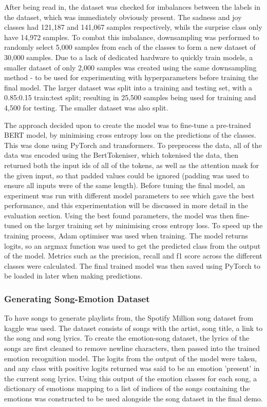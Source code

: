 \documentclass[11pt]{article}
\begin{document}
After being read in, the dataset was checked for imbalances between the labels in the dataset, which was immediately obviously present. The sadness and joy classes had 121,187 and 141,067 samples respectively, whils the surprise class only have 14,972 samples. To combat this imbalance, downsampling was performed to randomly select 5,000 samples from each of the classes to form a new dataset of 30,000 samples. Due to a lack of dedicated hardware to quickly train models, a smaller dataset of only 2,000 samples was created using the same downsampling method - to be used for experimenting with hyperparameters before training the final model. The larger dataset was split into a training and testing set, with a 0.85:0.15 train:test split; resulting in 25,500 samples being used for training and 4,500 for testing. The smaller dataset was also split.

The approach decided upon to create the model was to fine-tune a pre-trained BERT \cite{bert} model, by minimising cross entropy loss on the predictions of the classes. This was done using PyTorch and transformers. To preprocess the data, all of the data was encoded using the BertTokeniser, which tokenised the data, then returned both the input ids of all of the tokens, as well as the attention mask for the given input, so that padded values could be ignored (padding was used to ensure all inputs were of the same length). Before tuning the final model, an experiment was run with different model parameters to see which gave the best performance, and this experimentation will be discussed in more detail in the evaluation section. Using the best found parameters, the model was then fine-tuned on the larger training set by minimising cross entropy loss. To speed up the training process, Adam optimiser was used when training. The model returns logits, so an argmax function was used to get the predicted class from the output of the model. Metrics such as the precision, recall and f1 score across the different classes were calculated. The final trained model was then saved using PyTorch to be loaded in later when making predictions.

\subsubsection{Generating Song-Emotion Dataset}
To have songs to generate playlists from, the Spotify Million song dataset \cite{spotify} from kaggle was used. The dataset consists of songs with the artist, song title, a link to the song and song lyrics. To create the emotion-song dataset, the lyrics of the songs are first cleaned to remove newline characters, then passed into the trained emotion recognition model. The logits from the output of the model were taken, and any class with positive logits returned was said to be an emotion 'present' in the current song lyrics. Using this output of the emotion classes for each song, a dictionary of emotions mapping to a list of indices of the songs containing the emotions was constructed to be used alongside the song dataset in the final demo.
\end{document}
